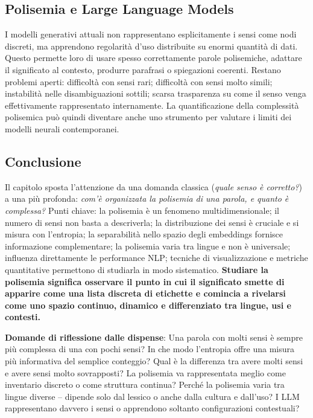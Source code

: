 \documentclass[12pt,a4paper]{article}
\begin{document}
\subsection{Polisemia e Large Language Models}

I modelli generativi attuali non rappresentano esplicitamente i sensi come nodi discreti, ma apprendono regolarit\`a d'uso distribuite su enormi quantit\`a di dati. Questo permette loro di usare spesso correttamente parole polisemiche, adattare il significato al contesto, produrre parafrasi o spiegazioni coerenti. Restano problemi aperti: difficolt\`a con sensi rari; difficolt\`a con sensi molto simili; instabilit\`a nelle disambiguazioni sottili; scarsa trasparenza su come il senso venga effettivamente rappresentato internamente. La quantificazione della complessit\`a polisemica pu\`o quindi diventare anche uno strumento per valutare i limiti dei modelli neurali contemporanei.

\subsection{Conclusione}

\begin{quizbox}
Il capitolo sposta l'attenzione da una domanda classica (\emph{quale senso \`e corretto?}) a una pi\`u profonda: \emph{com'\`e organizzata la polisemia di una parola, e quanto \`e complessa?} Punti chiave: la polisemia \`e un fenomeno multidimensionale; il numero di sensi non basta a descriverla; la distribuzione dei sensi \`e cruciale e si misura con l'entropia; la separabilit\`a nello spazio degli embeddings fornisce informazione complementare; la polisemia varia tra lingue e non \`e universale; influenza direttamente le performance NLP; tecniche di visualizzazione e metriche quantitative permettono di studiarla in modo sistematico. \textbf{Studiare la polisemia significa osservare il punto in cui il significato smette di apparire come una lista discreta di etichette e comincia a rivelarsi come uno spazio continuo, dinamico e differenziato tra lingue, usi e contesti.}
\end{quizbox}

\textbf{Domande di riflessione dalle dispense}: Una parola con molti sensi \`e sempre pi\`u complessa di una con pochi sensi? In che modo l'entropia offre una misura pi\`u informativa del semplice conteggio? Qual \`e la differenza tra avere molti sensi e avere sensi molto sovrapposti? La polisemia va rappresentata meglio come inventario discreto o come struttura continua? Perch\'e la polisemia varia tra lingue diverse -- dipende solo dal lessico o anche dalla cultura e dall'uso? I LLM rappresentano davvero i sensi o apprendono soltanto configurazioni contestuali?
\end{document}
